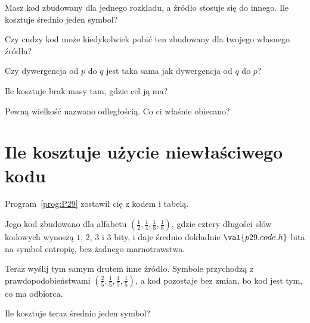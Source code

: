 \begin{quiz}
\item Masz kod zbudowany dla jednego rozkładu, a źródło stosuje się do
  innego. Ile kosztuje średnio jeden symbol? 
\item Czy cudzy kod może kiedykolwiek pobić ten zbudowany dla twojego
  własnego źródła? 
\item Czy dywergencja od $p$ do $q$ jest taka sama jak dywergencja od $q$ do
  $p$? 
\item Ile kosztuje brak masy tam, gdzie cel ją ma?
\item Pewną wielkość nazwano odległością. Co ci właśnie obiecano?
\end{quiz}

\section{Ile kosztuje użycie niewłaściwego kodu}
\label{sec:P30-cost}

\begin{fr}
Program~\ref{prog:P29} zostawił cię z kodem i tabelą.

Jego kod zbudowano dla alfabetu $(\frac12, \frac14, \frac18, \frac18)$, gdzie
cztery długości słów kodowych wynoszą $1$, $2$, $3$ i $3$ bity, i daje
średnio dokładnie $\val{p29.code.h}$ bita na symbol \dash{} entropię, bez
żadnego marnotrawstwa.

Teraz wyślij tym samym drutem inne źródło. Symbole przychodzą z
prawdopodobieństwami $(\frac25, \frac15, \frac15, \frac15)$, a kod pozostaje
bez zmian, bo kod jest tym, co ma odbiorca.

Ile kosztuje teraz średnio jeden symbol?
\dotline
\nextframe
\end{fr}

